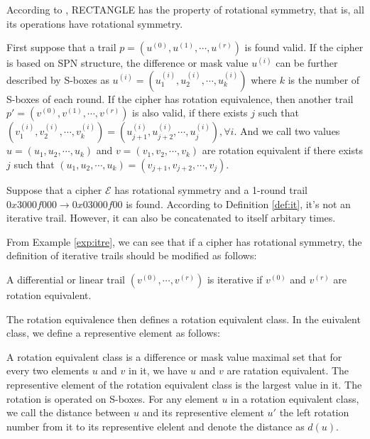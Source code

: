 According to \cite{ZBL15}, RECTANGLE has the property of rotational symmetry, that is, all its operations have rotational symmetry. 

\begin{definition}
	First suppose that a trail $p=(u^{(0)},u^{(1)},\cdots,u^{(r)})$ is found valid. If the cipher is based on SPN structure, the difference or mask value $u^{(i)}$ can be further described by S-boxes as $u^{(i)}=(u_1^{(i)},u_2^{(i)},\cdots,u_k^{(i)})$ where $k$ is the number of S-boxes of each round. If the cipher has rotation equivalence, then another trail $p'=(v^{(0)},v^{(1)},\cdots,v^{(r)})$ is also valid, if there exists $j$ such that $(v_1^{(i)},v_2^{(i)},\cdots,v_k^{(i)})=(u_{j+1}^{(i)},u_{j+2}^{(i)},\cdots,u_{j}^{(i)}),\forall i$. And we call two values $u=(u_1,u_2,\cdots,u_k)$ and $v=(v_1,v_2,\cdots,v_k)$ are rotation equivalent if there exists $j$ such that $(u_1,u_2,\cdots,u_k)=(v_{j+1},v_{j+2},\cdots,v_{j})$. 
\end{definition}

\begin{example}\label{exp:itre}
	Suppose that a cipher $\mathcal{E}$ has rotational symmetry and a 1-round trail $0x3000f000\rightarrow 0x03000f00$ is found. According to Definition \ref{def:it}, it's not an iterative trail. However, it can also be concatenated to itself arbitary times.
\end{example}

From Example \ref{exp:itre}, we can see that if a cipher has rotational symmetry, the definition of iterative trails should be modified as follows:  

\begin{definition}
	A differential or linear trail $(v^{(0)},\cdots,v^{(r)})$ is iterative if $v^{(0)}$ and $v^{(r)}$ are rotation equivalent.
\end{definition}

The rotation equivalence then defines a rotation equivalent class. In the euivalent class, we define a representive element as follows:

\begin{definition}
	A rotation equivalent class is a difference or mask value maximal set that for every two elements $u$ and $v$ in it, we have $u$ and $v$ are ratation equivalent. The representive element of the rotation equivalent class is the largest value in it. The rotation is operated on S-boxes. For any element $u$ in a rotation equivalent class, we call the distance between $u$ and its representive element $u'$ the left rotation number from it to its representive elelent and denote the distance as $d(u)$. 
\end{definition}

